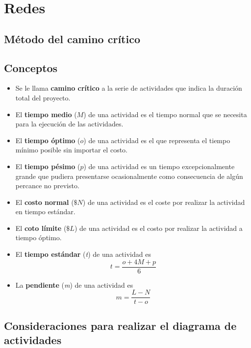 	\chapter{Redes}
	
	\section{Método del camino crítico}
	
	\section{Conceptos}
	
	\begin{itemize}
		\item Se le llama \textbf{camino crítico} a la serie de actividades que indica la duración total del proyecto.
		
		\item El \textbf{tiempo medio} ($M$) de una actividad es el tiempo normal que se necesita para la ejecución de las actividades.
		
		\item El \textbf{tiempo óptimo} ($o$) de una actividad es el que representa el tiempo mínimo posible sin importar el costo.
		
		\item El \textbf{tiempo pésimo} ($p$) de una actividad es un tiempo excepcionalmente grande que pudiera presentarse ocasionalmente como consecuencia de algún percance no previsto.
		
		\item El \textbf{costo normal} ($\$N$) de una actividad es el coste por realizar la actividad en tiempo estándar.
		
		\item El \textbf{coto límite} ($\$L$) de una actividad es el costo por realizar la actividad a tiempo óptimo.
		
		\item El \textbf{tiempo estándar} (\textit{t}) de una actividad es
		\[t = \frac{o+4M+p}{6}\]
		
		\item La \textbf{pendiente} (\textit{m}) de una actividad es
		\[m=\frac{L-N}{t-o}\]
	\end{itemize}
	
	\section{Consideraciones para realizar el diagrama de actividades}
	
